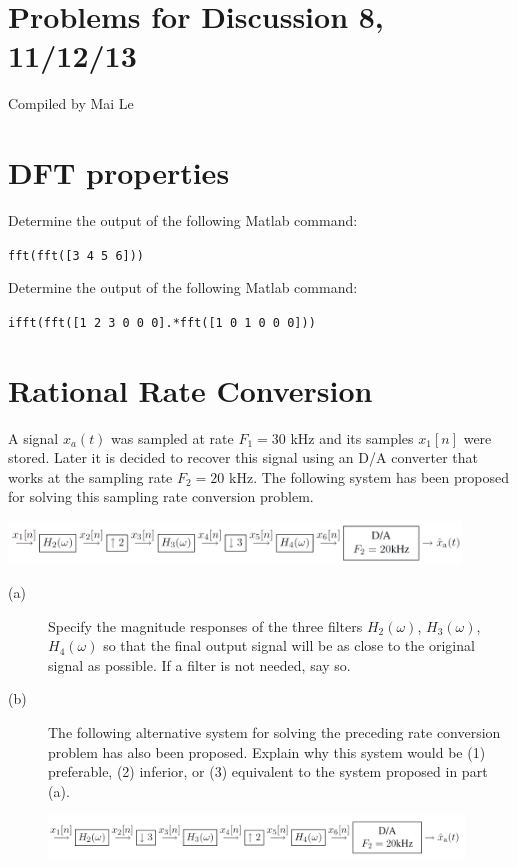 \documentclass[11pt]{article}
\begin{document}
{\small
\section*{Problems for Discussion 8, 11/12/13}
Compiled by Mai Le
}

\section{DFT properties}
Determine the output of the following Matlab command: 

\texttt{fft(fft([3 4 5 6]))}

Determine the output of the following Matlab command:

\texttt{ifft(fft([1 2 3 0 0 0].*fft([1 0 1 0 0 0]))}

\section{Rational Rate Conversion}
A signal $x_a(t)$ was sampled at rate $F_1 = 30$ kHz and its samples $x_1[n]$ were stored. Later it is decided to recover this signal using an D/A converter that works at the sampling rate $F_2 = 20$ kHz. The following system has been proposed for solving this sampling rate conversion problem.

\includegraphics[width = 0.9\textwidth]{rate_conv_a.png} 

\begin{description}
	\item[(a)] Specify the magnitude responses of the three filters $H_2(\omega)$, $H_3(\omega)$, $H_4(\omega)$ so that the final output signal will be as close to the original signal as possible. If a filter is not needed, say so.
	\item[(b)] The following alternative system for solving the preceding rate conversion problem has also been proposed. Explain why this system would be (1) preferable, (2) inferior, or (3) equivalent to the system proposed in part (a).
	
	\includegraphics[width = 0.9\textwidth]{rate_conv_b.png} 	
\end{description}
\end{document}
